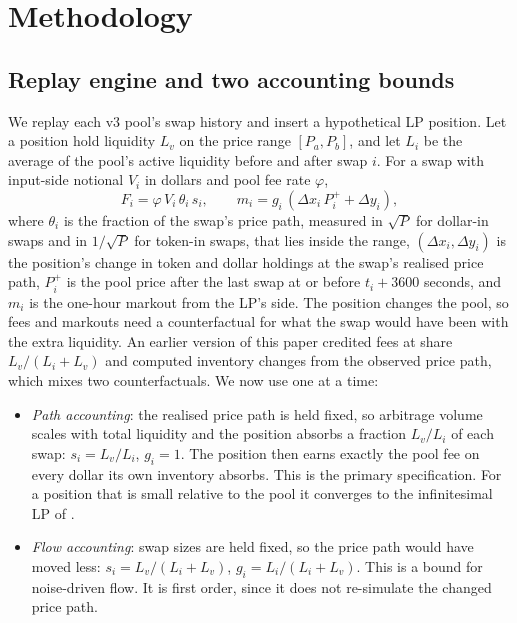 \documentclass[11pt]{article}
\begin{document}
\section{Methodology}\label{sec:method}

\subsection{Replay engine and two accounting bounds}

We replay each v3 pool's swap history and insert a hypothetical LP position. Let a position hold liquidity $L_v$ on the price range $[P_a, P_b]$, and let $L_i$ be the average of the pool's active liquidity before and after swap $i$. For a swap with input-side notional $V_i$ in dollars and pool fee rate $\varphi$,
\begin{equation}
F_i = \varphi \, V_i \, \theta_i \, s_i, \qquad m_i = g_i\,(\Delta x_i \, P^{+}_i + \Delta y_i),
\end{equation}
where $\theta_i$ is the fraction of the swap's price path, measured in $\sqrt{P}$ for dollar-in swaps and in $1/\sqrt{P}$ for token-in swaps, that lies inside the range, $(\Delta x_i, \Delta y_i)$ is the position's change in token and dollar holdings at the swap's realised price path, $P^{+}_i$ is the pool price after the last swap at or before $t_i + 3600$ seconds, and $m_i$ is the one-hour markout from the LP's side. The position changes the pool, so fees and markouts need a counterfactual for what the swap would have been with the extra liquidity. An earlier version of this paper credited fees at share $L_v/(L_i+L_v)$ and computed inventory changes from the observed price path, which mixes two counterfactuals. We now use one at a time:
\begin{itemize}[leftmargin=*,itemsep=1pt]
\item \emph{Path accounting}: the realised price path is held fixed, so arbitrage volume scales with total liquidity and the position absorbs a fraction $L_v/L_i$ of each swap: $s_i = L_v/L_i$, $g_i = 1$. The position then earns exactly the pool fee on every dollar its own inventory absorbs. This is the primary specification. For a position that is small relative to the pool it converges to the infinitesimal LP of \citet{sadeghi2026active}.
\item \emph{Flow accounting}: swap sizes are held fixed, so the price path would have moved less: $s_i = L_v/(L_i+L_v)$, $g_i = L_i/(L_i+L_v)$. This is a bound for noise-driven flow. It is first order, since it does not re-simulate the changed price path.
\end{itemize}
\end{document}
